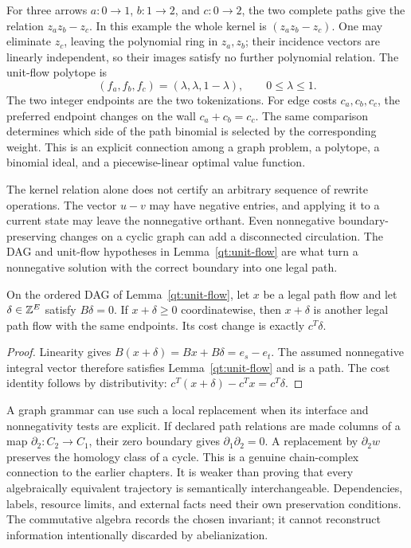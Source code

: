 For three arrows $a:0\to1$, $b:1\to2$, and $c:0\to2$, the two complete
paths give the relation $z_a z_b-z_c$. In this example the whole kernel is
$(z_a z_b-z_c)$. One may eliminate $z_c$, leaving the polynomial ring in
$z_a,z_b$; their incidence vectors are linearly independent, so their
images satisfy no further polynomial relation. The unit-flow polytope is
\[
 (f_a,f_b,f_c)=(\lambda,\lambda,1-\lambda),\qquad0\leq\lambda\leq1.
\]
The two integer endpoints are the two tokenizations. For edge costs
$c_a,c_b,c_c$, the preferred endpoint changes on the wall
$c_a+c_b=c_c$. The same comparison determines which side of the path
binomial is selected by the corresponding weight. This is an explicit
connection among a graph problem, a polytope, a binomial ideal, and a
piecewise-linear optimal value function.

The kernel relation alone does not certify an arbitrary sequence of
rewrite operations. The vector $u-v$ may have negative entries, and
applying it to a current state may leave the nonnegative orthant.
Even nonnegative boundary-preserving changes on a cyclic graph can add
a disconnected circulation. The DAG and unit-flow hypotheses in
Lemma~\ref{qt:unit-flow} are what turn a nonnegative solution with the
correct boundary into one legal path.

\begin{proposition}
\label{qt:rewrite}
On the ordered DAG of Lemma~\ref{qt:unit-flow}, let $x$ be a legal path
flow and let $\delta\in\mathbb{Z}^E$ satisfy $B\delta=0$.
If $x+\delta\geq0$ coordinatewise, then $x+\delta$ is another legal
path flow with the same endpoints. Its cost change is exactly $c^T\delta$.
\end{proposition}
\begin{proof}
Linearity gives $B(x+\delta)=Bx+B\delta=e_s-e_t$.
The assumed nonnegative integral vector therefore satisfies
Lemma~\ref{qt:unit-flow} and is a path. The cost identity follows by
distributivity: $c^T(x+\delta)-c^Tx=c^T\delta$.
\end{proof}

A graph grammar can use such a local replacement when its interface and
nonnegativity tests are explicit. If declared path relations are made
columns of a map $\partial_2:C_2\to C_1$, their zero boundary gives
$\partial_1\partial_2=0$. A replacement by $\partial_2 w$ preserves the
homology class of a cycle. This is a genuine chain-complex connection to
the earlier chapters. It is weaker than proving that every algebraically
equivalent trajectory is semantically interchangeable. Dependencies,
labels, resource limits, and external facts need their own preservation
conditions. The commutative algebra records the chosen invariant; it
cannot reconstruct information intentionally discarded by abelianization.

